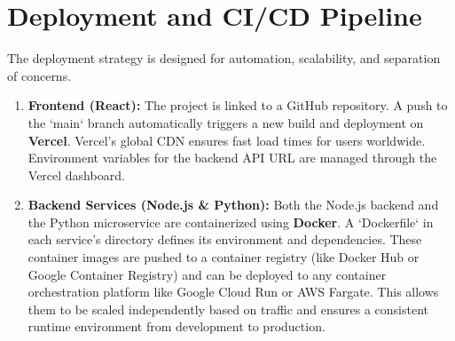 \section{Deployment and CI/CD Pipeline}
\label{sec:impl-deployment}
The deployment strategy is designed for automation, scalability, and separation of concerns.
\begin{enumerate}
    \item \textbf{Frontend (React):} The project is linked to a GitHub repository. A push to the `main` branch automatically triggers a new build and deployment on \textbf{Vercel}. Vercel's global CDN ensures fast load times for users worldwide. Environment variables for the backend API URL are managed through the Vercel dashboard.
    
    \item \textbf{Backend Services (Node.js \& Python):} Both the Node.js backend and the Python microservice are containerized using \textbf{Docker}. A `Dockerfile` in each service's directory defines its environment and dependencies. These container images are pushed to a container registry (like Docker Hub or Google Container Registry) and can be deployed to any container orchestration platform like Google Cloud Run or AWS Fargate. This allows them to be scaled independently based on traffic and ensures a consistent runtime environment from development to production.
\end{enumerate}